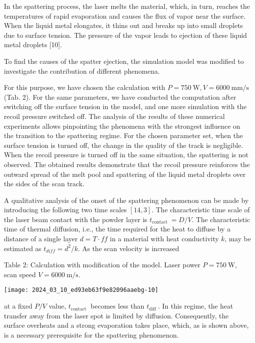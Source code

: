 \documentclass[10pt]{article}
\begin{document}
In the spattering process, the laser melts the material, which, in turn, reaches the temperatures of rapid evaporation and causes the flux of vapor near the surface. When the liquid metal elongates, it thins out and breaks up into small droplets due to surface tension. The pressure of the vapor leads to ejection of these liquid metal droplets [10].

To find the causes of the spatter ejection, the simulation model was modified to investigate the contribution of different phenomena.

For this purpose, we have chosen the calculation with $P=750 \mathrm{~W}, V=6000 \mathrm{~mm} / \mathrm{s}$ (Tab. 2). For the same parameters, we have conducted the computation after switching off the surface tension in the model, and one more simulation with the recoil pressure switched off. The analysis of the results of these numerical experiments allows pinpointing the phenomena with the strongest influence on the transition to the spattering regime. For the chosen parameter set, when the surface tension is turned off, the change in the quality of the track is negligible. When the recoil pressure is turned off in the same situation, the spattering is not observed. The obtained results demonstrate that the recoil pressure reinforces the outward spread of the melt pool and spattering of the liquid metal droplets over the sides of the scan track.

A qualitative analysis of the onset of the spattering phenomenon can be made by introducing the following two time scales $[14,3]$. The characteristic time scale of the laser beam contact with the powder layer is $t_{\text {contact }}=D / V$. The characteristic time of thermal diffusion, i.e., the time required for the heat to diffuse by a distance of a single layer $d=T \cdot f f$ in a material with heat conductivity $k$, may be estimated as $t_{d i f f}=d^{2} / k$. As the scan velocity is increased

Table 2: Calculation with modification of the model. Laser power $P=750 \mathrm{~W}$, scan speed $V=6000 \mathrm{~m} / \mathrm{s}$.

\begin{center}
\texttt{[image: 2024\_03\_10\_ed93eb63f9e82096aaebg-10]}
\end{center}

at a fixed $P / V$ value, $t_{\text {contact }}$ becomes less than $t_{\text {diff }}$. In this regime, the heat transfer away from the laser spot is limited by diffusion. Consequently, the surface overheats and a strong evaporation takes place, which, as is shown above, is a necessary prerequisite for the spattering phenomenon.
\end{document}
